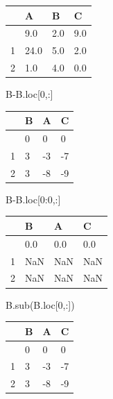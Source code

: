 \documentclass[
  a4paper,
  DIV=11,
  numbers=noendperiod]{scrreprt}
\newenvironment{Shaded}{\begin{snugshade}}{\end{snugshade}}
\newcommand{\DecValTok}[1]{\textcolor[rgb]{0.68,0.00,0.00}{#1}}
\newcommand{\NormalTok}[1]{\textcolor[rgb]{0.00,0.23,0.31}{#1}}
\newcommand{\OperatorTok}[1]{\textcolor[rgb]{0.37,0.37,0.37}{#1}}
\begin{document}
\begin{longtable}[]{@{}llll@{}}
\toprule\noalign{}
& A & B & C \\
\midrule\noalign{}
\endhead
\bottomrule\noalign{}
\endlastfoot
0 & 9.0 & 2.0 & 9.0 \\
1 & 24.0 & 5.0 & 2.0 \\
2 & 1.0 & 4.0 & 0.0 \\
\end{longtable}

\begin{Shaded}
\begin{Highlighting}[]
\NormalTok{B}\OperatorTok{{-}}\NormalTok{B.loc[}\DecValTok{0}\NormalTok{,:]}
\end{Highlighting}
\end{Shaded}

\begin{longtable}[]{@{}llll@{}}
\toprule\noalign{}
& B & A & C \\
\midrule\noalign{}
\endhead
\bottomrule\noalign{}
\endlastfoot
0 & 0 & 0 & 0 \\
1 & 3 & -3 & -7 \\
2 & 3 & -8 & -9 \\
\end{longtable}

\begin{Shaded}
\begin{Highlighting}[]
\NormalTok{B}\OperatorTok{{-}}\NormalTok{B.loc[}\DecValTok{0}\NormalTok{:}\DecValTok{0}\NormalTok{,:]}
\end{Highlighting}
\end{Shaded}

\begin{longtable}[]{@{}llll@{}}
\toprule\noalign{}
& B & A & C \\
\midrule\noalign{}
\endhead
\bottomrule\noalign{}
\endlastfoot
0 & 0.0 & 0.0 & 0.0 \\
1 & NaN & NaN & NaN \\
2 & NaN & NaN & NaN \\
\end{longtable}

\begin{Shaded}
\begin{Highlighting}[]
\NormalTok{B.sub(B.loc[}\DecValTok{0}\NormalTok{,:])}
\end{Highlighting}
\end{Shaded}

\begin{longtable}[]{@{}llll@{}}
\toprule\noalign{}
& B & A & C \\
\midrule\noalign{}
\endhead
\bottomrule\noalign{}
\endlastfoot
0 & 0 & 0 & 0 \\
1 & 3 & -3 & -7 \\
2 & 3 & -8 & -9 \\
\end{longtable}
\end{document}
